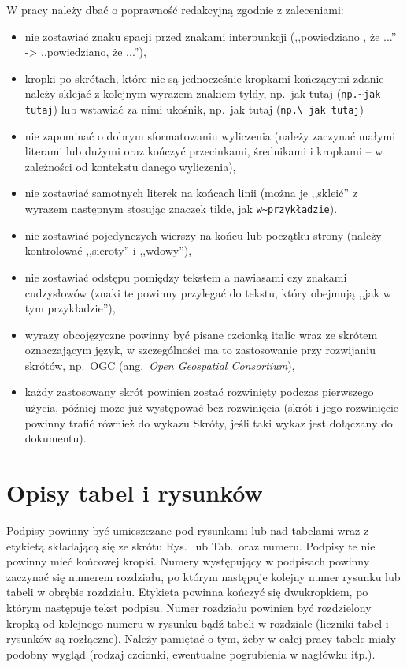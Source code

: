 W pracy należy dbać o poprawność redakcyjną zgodnie z zaleceniami:
\begin{itemize}
\item nie zostawiać znaku spacji przed znakami interpunkcji (,,powiedziano , że ...'' -> ,,powiedziano, że ...''),
\item kropki po skrótach, które nie są jednocześnie kropkami kończącymi zdanie należy sklejać z kolejnym wyrazem znakiem tyldy, np.~jak tutaj (\verb?np.~jak tutaj?) lub wstawiać za nimi ukośnik, np.\ jak tutaj (\verb?np.\ jak tutaj?)
\item nie zapominać o dobrym sformatowaniu wyliczenia (należy zaczynać małymi literami lub dużymi oraz kończyć przecinkami, średnikami i kropkami -- w zależności od kontekstu danego wyliczenia),
\item nie zostawiać samotnych literek na końcach linii  (można je ,,skleić'' z wyrazem następnym stosując znaczek tilde, jak \verb+w~przykładzie+).
\item nie zostawiać pojedynczych wierszy na końcu lub początku strony (należy kontrolować ,,sieroty'' i ,,wdowy''),
\item nie zostawiać odstępu pomiędzy tekstem a nawiasami czy znakami cudzysłowów (znaki te powinny przylegać do tekstu, który obejmują ,,jak w tym przykładzie''),
\item wyrazy obcojęzyczne powinny być pisane czcionką italic wraz ze skrótem oznaczającym język, w szczególności ma to zastosowanie przy rozwijaniu skrótów, np.~OGC (ang.~\emph{Open Geospatial Consortium}),
\item każdy zastosowany skrót powinien zostać rozwinięty podczas pierwszego użycia, później może już występować bez rozwinięcia (skrót i jego rozwinięcie powinny trafić również do wykazu Skróty, jeśli taki wykaz jest dołączany do dokumentu). 
\end{itemize}

\section{Opisy tabel i rysunków}
Podpisy powinny być umieszczane pod rysunkami lub nad tabelami wraz z etykietą składającą się ze skrótu Rys.\ lub Tab.\ oraz numeru. Podpisy te nie powinny mieć końcowej kropki. Numery występujący w podpisach powinny zaczynać się numerem rozdziału, po którym następuje kolejny numer rysunku lub tabeli w obrębie rozdziału. Etykieta powinna kończyć się dwukropkiem, po którym następuje tekst podpisu. Numer rozdziału powinien być rozdzielony kropką od kolejnego numeru w rysunku bądź tabeli w rozdziale (liczniki tabel i rysunków są rozłączne). Należy pamiętać o tym, żeby w całej pracy tabele miały podobny wygląd (rodzaj czcionki, ewentualne pogrubienia w nagłówku itp.). %

